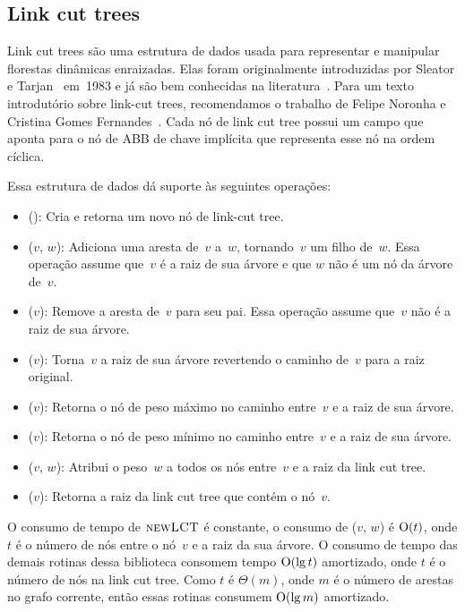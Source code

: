 \subsection{Link cut trees}
\label{sec:linkcuttree}
Link cut trees são uma estrutura de dados usada para representar e manipular florestas dinâmicas enraizadas.
Elas foram originalmente introduzidas por Sleator e Tarjan~\cite{SleatroTarjanLinkCutTree1983,} em~1983 e já são bem conhecidas na literatura~\cite{linkcuttree,EncyclopediaAlgorithms,tarjanWerneck2010}.
Para um texto introdutório sobre link-cut trees, recomendamos o trabalho de Felipe Noronha e Cristina Gomes Fernandes~\cite{linkcuttree}.
Cada nó de link cut tree possui um campo  que aponta para o nó de ABB de chave implícita que representa esse nó na ordem cíclica.

Essa estrutura de dados dá suporte às seguintes operações:
\begin{itemize}
\item \linkcutCreate(): Cria e retorna um novo nó de link-cut tree.
\item \linkcutAddEdge($v$, $w$): Adiciona uma aresta de~$v$ a~$w$, tornando~$v$ um filho de~$w$. Essa operação assume que~$v$ é a raiz de sua árvore e que $w$ não é um nó da árvore de~$v$.
\item \linkcutDelEdge($v$): Remove a aresta de~$v$ para seu pai.
	Essa operação assume que~$v$ não é a raiz de sua árvore.
\item \linkcutEvert($v$): Torna~$v$ a raiz de sua árvore revertendo o caminho de~$v$ para a raiz original.
\item \linkcutMax($v$): Retorna o nó de peso máximo no caminho entre~$v$ e a raiz de sua árvore.
\item \linkcutMin($v$): Retorna o nó de peso mínimo no caminho entre~$v$ e a raiz de sua árvore.
\item \linkcutWeight($v$, $w$): Atribui o peso~$w$ a todos os nós entre~$v$ e a raiz da link cut tree.
\item \linkcutRoot($v$): Retorna a raiz da link cut tree que contém o nó~$v$.
\end{itemize}

O consumo de tempo de $\text{\scshape newLCT}$ é constante, o consumo de \linkcutWeight($v$, $w$) é $\mathrm{O}(t)$, onde $t$ é o número de nós entre o nó~$v$ e a raiz da sua árvore. O consumo de tempo das demais rotinas dessa biblioteca consomem tempo $\mathrm{O}(\lg t)$ amortizado, onde $t$ é o número de nós na link cut tree. Como $t$ é $\Theta(m)$, onde $m$ é o número de arestas no grafo corrente, então essas rotinas consumem $\mathrm{O}(\lg m)$ amortizado.


